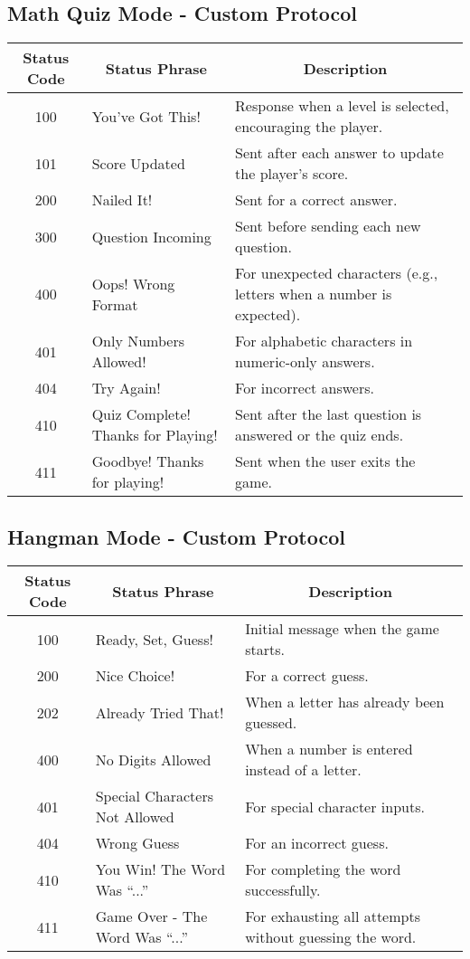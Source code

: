 \documentclass[12pt]{article}
\begin{document}
\subsection{Math Quiz Mode - Custom Protocol}
\begin{tabularx}{\textwidth}{|c|l|X|}
\hline
\multicolumn{1}{|c|}{\textbf{Status Code}} & \multicolumn{1}{c|}{\textbf{Status Phrase}} & \multicolumn{1}{c|}{\textbf{Description}} \\
\hline
100 & You've Got This! & Response when a level is selected, encouraging the player. \\
\hline
101 & Score Updated & Sent after each answer to update the player's score. \\
\hline
200 & Nailed It! & Sent for a correct answer. \\
\hline
300 & Question Incoming & Sent before sending each new question. \\
\hline
400 & Oops! Wrong Format & For unexpected characters (e.g., letters when a number is expected). \\
\hline
401 & Only Numbers Allowed! & For alphabetic characters in numeric-only answers. \\
\hline
404 & Try Again! & For incorrect answers. \\
\hline
410 & Quiz Complete! Thanks for Playing! & Sent after the last question is answered or the quiz ends. \\
\hline
411 & Goodbye! Thanks for playing! & Sent when the user exits the game. \\
\hline
\end{tabularx}

\subsection{Hangman Mode - Custom Protocol}
\begin{tabularx}{\textwidth}{|c|l|X|}
\hline
\multicolumn{1}{|c|}{\textbf{Status Code}} & \multicolumn{1}{c|}{\textbf{Status Phrase}} & \multicolumn{1}{c|}{\textbf{Description}} \\
\hline
100 & Ready, Set, Guess! & Initial message when the game starts. \\
\hline
200 & Nice Choice! & For a correct guess. \\
\hline
202 & Already Tried That! & When a letter has already been guessed. \\
\hline
400 & No Digits Allowed & When a number is entered instead of a letter. \\
\hline
401 & Special Characters Not Allowed & For special character inputs. \\
\hline
404 & Wrong Guess & For an incorrect guess. \\
\hline
410 & You Win! The Word Was ``...'' & For completing the word successfully. \\
\hline
411 & Game Over - The Word Was ``...'' & For exhausting all attempts without guessing the word. \\
\hline
\end{tabularx}
\end{document}
